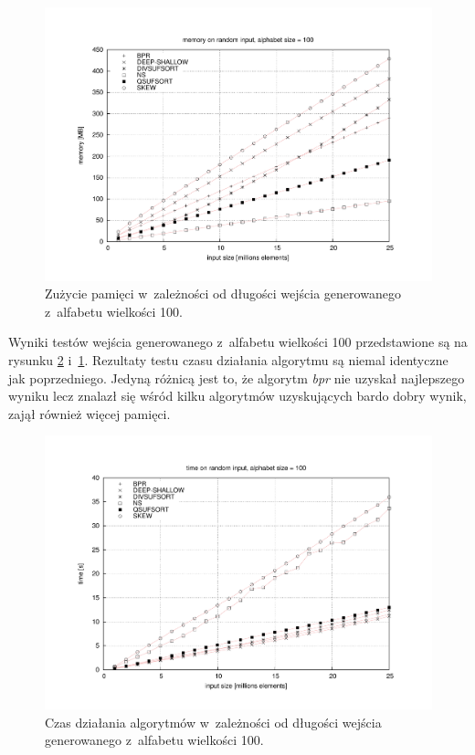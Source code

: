\begin{figure}[tp]
   \begin{center}
      \includegraphics[width=\linewidth]{figures/results/random-input-memory-100.pdf}
    \end{center}        
    \caption{Zużycie pamięci w~zależności od długości wejścia generowanego z~alfabetu wielkości 100.}%
    \label{rys:random-input-memory-100}
\end{figure}

Wyniki testów wejścia generowanego z~alfabetu wielkości 100 przedstawione są na rysunku
\ref{rys:random-input-time-100} i~\ref{rys:random-input-memory-100}.
Rezultaty testu czasu działania algorytmu są niemal identyczne jak poprzedniego. Jedyną różnicą jest
to, że algorytm \emph{bpr} nie uzyskał najlepszego wyniku lecz znalazł się wśród kilku algorytmów
uzyskujących bardo dobry wynik, zajął również więcej pamięci.

\begin{figure}[tp]
   \begin{center}
        \includegraphics[width=\linewidth]{figures/results/random-input-time-100.pdf}
    \end{center}        
    \caption{Czas działania algorytmów w~zależności od długości wejścia generowanego z~alfabetu wielkości 100.}%
    \label{rys:random-input-time-100}
\end{figure} 

